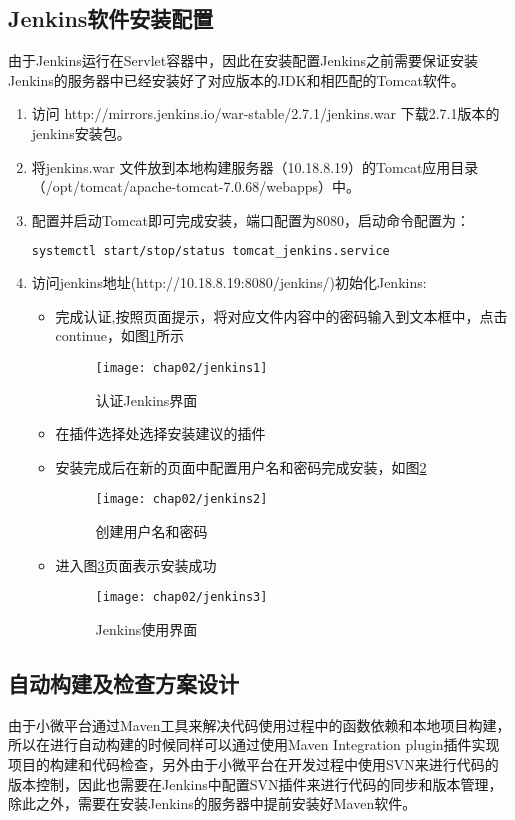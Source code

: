 \subsection{Jenkins软件安装配置}
由于Jenkins运行在Servlet容器中，因此在安装配置Jenkins之前需要保证安装Jenkins的服务器中已经安装好了对应版本的JDK和相匹配的Tomcat软件\cite{赵杰昌2014基于}。
\begin{enumerate}
\item 访问 http://mirrors.jenkins.io/war-stable/2.7.1/jenkins.war 下载2.7.1版本的jenkins安装包。
\item 将jenkins.war 文件放到本地构建服务器（10.18.8.19）的Tomcat应用目录（/opt/tomcat/apache-tomcat-7.0.68/webapps）中。
\item 配置并启动Tomcat即可完成安装，端口配置为8080，启动命令配置为：
\begin{lstlisting}[language=bash,numbers=none]
systemctl start/stop/status tomcat_jenkins.service
\end{lstlisting}
\item 访问jenkins地址(http://10.18.8.19:8080/jenkins/)初始化Jenkins:
\begin{itemize}
\item 完成认证,按照页面提示，将对应文件内容中的密码输入到文本框中，点击continue，如图\ref{fig:jenkins1}所示
\begin{figure}[H] %
  \centering
  \texttt{[image: chap02/jenkins1]}
  \caption{认证Jenkins界面}
  \label{fig:jenkins1}
\end{figure}
\item 在插件选择处选择安装建议的插件
\item 安装完成后在新的页面中配置用户名和密码完成安装，如图\ref{fig:jenkins2}
\begin{figure}[H] %
  \centering
  \texttt{[image: chap02/jenkins2]}
  \caption{创建用户名和密码}
  \label{fig:jenkins2}
\end{figure}
\item 进入图\ref{fig:jenkins3}页面表示安装成功
\begin{figure}[H] %
  \centering
  \texttt{[image: chap02/jenkins3]}
  \caption{Jenkins使用界面}
  \label{fig:jenkins3}
\end{figure}
\end{itemize}
\end{enumerate}
\subsection{自动构建及检查方案设计}
由于小微平台通过Maven工具来解决代码使用过程中的函数依赖和本地项目构建\cite{董晓光2014使用}，所以在进行自动构建的时候同样可以通过使用Maven Integration plugin插件实现项目的构建和代码检查，另外由于小微平台在开发过程中使用SVN来进行代码的版本控制，因此也需要在Jenkins中配置SVN插件来进行代码的同步和版本管理，除此之外，需要在安装Jenkins的服务器中提前安装好Maven软件。

